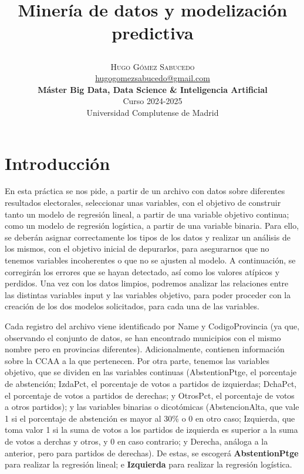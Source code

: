 \documentclass[a4paper,onecolumn]{extarticle}
\title{\begin{center} \Huge Minería de datos y modelización predictiva \end{center}} %
\author{
    \textsc{\Huge Hugo Gómez Sabucedo} \\ %
    \large \href{mailto:hugogomezsabucedo@gmail.com}{hugogomezsabucedo@gmail.com} \\ [2ex] %
    \Large \textbf{Máster Big Data, Data Science \& Inteligencia Artificial} \\
    \normalsize Curso 2024-2025 \\
    \large Universidad Complutense de Madrid
}
\date{} %
\let\stdsection\section
\renewcommand\section{\newpage\stdsection}
\begin{document}
\maketitle
\tableofcontents
\begin{sloppypar}


\section{Introducción} \label{enunciado}
En esta práctica se nos pide, a partir de un archivo con datos sobre diferentes resultados electorales, seleccionar unas variables, con el objetivo
de construir tanto un modelo de regresión lineal, a partir de una variable objetivo continua; como un modelo de regresión logística, a partir de una
variable binaria. Para ello, se deberán asignar correctamente los tipos de los datos y realizar un análisis de los mismos, con el objetivo inicial 
de depurarlos, para asegurarnos que no tenemos variables incoherentes o que no se ajusten al modelo. A continuación, se corregirán los errores que se 
hayan detectado, así como los valores atípicos y perdidos. Una vez con los datos limpios, podremos analizar las relaciones entre las distintas variables 
input y las variables objetivo, para poder proceder con la creación de los dos modelos solicitados, para cada una de las variables.

Cada registro del archivo viene identificado por Name y CodigoProvincia (ya que, observando el conjunto de datos, se han encontrado municipios con el mismo
nombre pero en provincias diferentes). Adicionalmente, contienen información sobre la CCAA a la que pertenecen. Por otra parte, tenemos las variables objetivo,
que se dividen en las variables continuas (AbstentionPtge, el porcentaje de abstención; IzdaPct, el porcentaje de votos a partidos de izquierdas; DchaPct, el
porcentaje de votos a partidos de derechas; y OtrosPct, el porcentaje de votos a otros partidos); y las variables binarias o dicotómicas (AbstencionAlta, que 
vale 1 si el porcentaje de abstención es mayor al 30\% o 0 en otro caso; Izquierda, que toma valor 1 si la suma de votos a los partidos de izquierda es 
superior a la suma de votos a derchas y otros, y 0 en caso contrario; y Derecha, análoga a la anterior, pero para partidos de derechas). De estas, se
escogerá \textbf{AbstentionPtge} para realizar la regresión lineal; e \textbf{Izquierda} para realizar la regresión logística.


\end{sloppypar}
\end{document}
